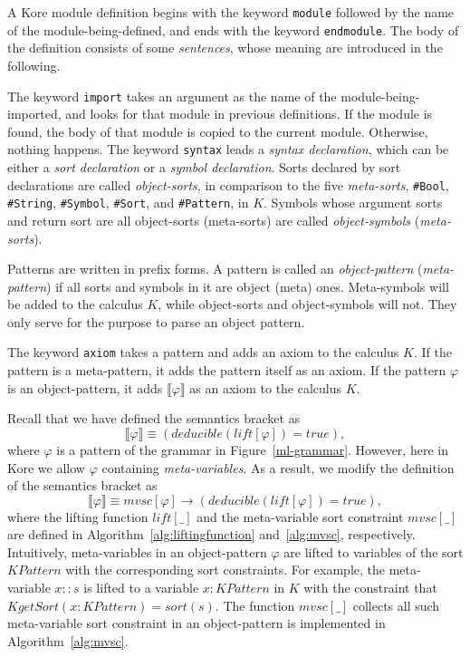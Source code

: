 \documentclass[UTF8,11pt]{article}
\theoremstyle{plain}
\theoremstyle{definition}
\theoremstyle{remark}
\newcommand{\Bracket}[1]{\llbracket#1\rrbracket}
\newcommand{\cln}{{:}}
\newcommand{\KPattern}{\mathit{KPattern}}
\newcommand{\KgetSort}{\mathit{KgetSort}}
\begin{document}
A Kore module definition begins with the keyword \verb|module| followed by the 
name of the module-being-defined, and ends with the keyword \verb|endmodule|. 
The body of the definition consists of some \emph{sentences}, whose meaning are 
introduced in the following.

The keyword \verb|import| takes an argument as the name of the 
module-being-imported, and looks for that module in previous definitions. 
If the module is found, the body of that module is copied to the current module.
Otherwise, nothing happens. 
The keyword \verb|syntax| leads a \emph{syntax declaration}, which can be 
either a \emph{sort declaration} or a \emph{symbol declaration}.
Sorts declared by sort declarations are called \emph{object-sorts}, in 
comparison to the five \emph{meta-sorts}, \verb|#Bool|, \verb|#String|, 
\verb|#Symbol|, \verb|#Sort|, and \verb|#Pattern|, in $K$. 
Symbols whose argument sorts and return sort are all object-sorts (meta-sorts) 
are called \emph{object-symbols} (\emph{meta-sorts}).

Patterns are written in prefix forms. 
A pattern is called an \emph{object-pattern} (\emph{meta-pattern}) if all sorts 
and symbols in it are object (meta) ones.
Meta-symbols will be added to the calculus $K$, while object-sorts and 
object-symbols will not.
They only serve for the purpose to parse an object pattern. 

The keyword \verb|axiom| takes a pattern and adds an axiom to the calculus $K$.
If the pattern is a meta-pattern, it adds the pattern itself as an axiom.
If the pattern $\varphi$ is an object-pattern, it adds $\Bracket{\varphi}$ as 
an axiom to the calculus $K$.

Recall that we have defined the semantics bracket as
\begin{equation*}
\Bracket{\varphi} \equiv 
\left(\textit{deducible}\left(\mathit{lift}[\varphi]\right) = true\right),
\end{equation*}
where $\varphi$ is a pattern of the grammar in Figure~\ref{ml-grammar}.
However, here in Kore we allow $\varphi$ containing \emph{meta-variables}.
As a result, we modify the definition of the semantics bracket as 
$$\Bracket{\varphi} \equiv \mathit{mvsc}[\varphi] \to 
(deducible\left(\mathit{lift}[\varphi]\right) = true),$$
where the lifting function $\mathit{lift}[\_]$ and the meta-variable sort 
constraint $\mathit{mvsc}[\_]$ are defined in 
Algorithm~\ref{alg:liftingfunction} and~\ref{alg:mvsc}, respectively.
Intuitively, meta-variables in an object-pattern $\varphi$ are lifted to 
variables of the sort $\KPattern$ with the corresponding sort constraints. 
For example, the meta-variable $x \cln\cln s$ is lifted to a variable $x \cln 
\KPattern$ in $K$ with the constraint that $\KgetSort(x \cln \KPattern) = 
sort(s)$. The function $\mathit{mvsc}[\_]$ collects all such meta-variable sort 
constraint in an object-pattern is implemented in Algorithm~\ref{alg:mvsc}.
\end{document}
